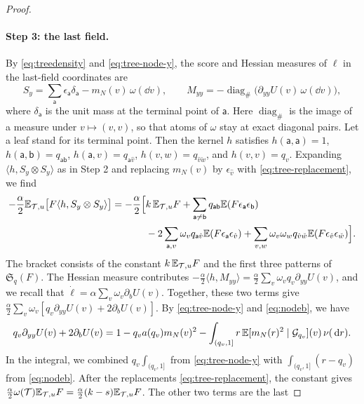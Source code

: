 \begin{proof}
\paragraph{Step 3: the last field.}
By \eqref{eq:treedensity} and \eqref{eq:tree-node-y}, the score and
Hessian measures of $\ell$ in the last-field coordinates are
\[
 S_y=\sum_{\mathsf a}\epsilon_{\mathsf a}\delta_{\mathsf a}
                      -m_N(v)\,\omega(\dd v),\qquad
 M_{yy}=-\operatorname{diag}_{\#}
                  \bigl(\partial_{yy}U(v)\,\omega(\dd v)\bigr),
\]
where $\delta_{\mathsf a}$ is the unit mass at the terminal point of
$\mathsf a$. Here $\operatorname{diag}_{\#}$ is the image of a measure
under $v\mapsto(v,v)$, so that atoms of $\omega$ stay at exact diagonal
pairs. Let a leaf stand for its terminal point. Then the kernel $h$
satisfies $h(\mathsf a,\mathsf a)=1$,
$h(\mathsf a,\mathsf b)=q_{\mathsf{ab}}$,
$h(\mathsf a,v)=q_{\mathsf a\hat v}$, $h(v,w)=q_{\hat v\check w}$, and
$h(v,v)=q_v$. Expanding $\langle h,S_y\otimes S_y\rangle$ as in Step 2
and replacing $m_N(v)$ by $\epsilon_{\hat v}$ with
\eqref{eq:tree-replacement}, we find
\[
 \begin{aligned}
 -\frac\alpha2\mathbb E_{\mathcal T,u}\bigl[F\langle h,S_y\otimes S_y\rangle\bigr]
 =-\frac\alpha2\Bigl[&k\,\mathbb E_{\mathcal T,u}F
 +\sum_{\mathsf a\ne\mathsf b}q_{\mathsf{ab}}
   \mathbb E(F\epsilon_{\mathsf a}\epsilon_{\mathsf b})\\
 &-2\sum_{\mathsf a,v}\omega_vq_{\mathsf a\hat v}
   \mathbb E(F\epsilon_{\mathsf a}\epsilon_{\hat v})
 +\sum_{v,w}\omega_v\omega_wq_{\hat v\check w}
   \mathbb E(F\epsilon_{\hat v}\epsilon_{\check w})\Bigr].
 \end{aligned}
\]
The bracket consists of the constant $k\,\mathbb E_{\mathcal T,u}F$ and the
first three patterns of $\mathfrak S_q(F)$. The Hessian measure
contributes
$-\frac\alpha2\langle h,M_{yy}\rangle=\frac\alpha2\sum_v\omega_vq_v
\partial_{yy}U(v)$, and we recall that
$\dot\ell=\alpha\sum_v\omega_v\partial_bU(v)$. Together, these two terms
give $\frac\alpha2\sum_v\omega_v[q_v\partial_{yy}U(v)+2\partial_bU(v)]$.
By \eqref{eq:tree-node-y} and \eqref{eq:nodeb}, we have
\[
 q_v\partial_{yy}U(v)+2\partial_bU(v)
 =1-q_va(q_v)m_N(v)^2
   -\int_{(q_v,1]}r\,\mathbb E[m_N(r)^2\mid\mathcal G_{q_v}](v)\,\nu(\,\mathrm d r).
\]
In the integral, we combined $q_v\int_{(q_v,1]}$ from
\eqref{eq:tree-node-y} with $\int_{(q_v,1]}(r-q_v)$ from \eqref{eq:nodeb}.
After the replacements \eqref{eq:tree-replacement}, the constant gives
$\frac\alpha2\omega(\mathcal T)\mathbb E_{\mathcal T,u}F
=\frac\alpha2(k-s)\mathbb E_{\mathcal T,u}F$. The other two terms are the last

\end{proof}
